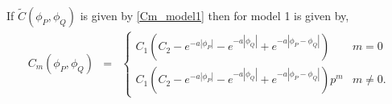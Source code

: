  
If $\tilde{C}(\phi_P, \phi_Q)$ is  given by \eqref{Cm_model1} then \Cm for model 1 is given by,
\begin{eqnarray*}
	C_m(\phi_P, \phi_Q) &=& \left\{ \begin{array}{ll}
	C_1\left(C_2 - e^{-a|\phi_P|} - e^{-a|\phi_Q|} + e^{-a|\phi_P - \phi_Q|}\right)     & m = 0 \\
	C_1\left(C_2 - e^{-a|\phi_P|} - e^{-a|\phi_Q|} + e^{-a|\phi_P - \phi_Q|}\right)p^m  & m \ne 0.
	\end{array}
	\right.
\end{eqnarray*}




%
